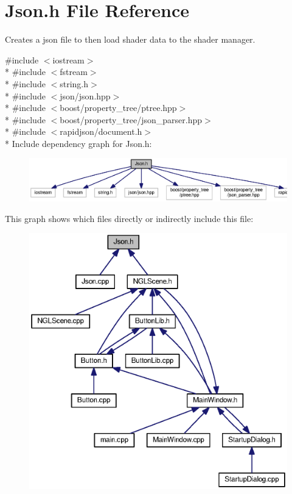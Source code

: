 \section{Json.\-h File Reference}
\label{_json_8h}


Creates a json file to then load shader data to the shader manager.  


{\ttfamily \#include $<$iostream$>$}\\*
{\ttfamily \#include $<$fstream$>$}\\*
{\ttfamily \#include $<$string.\-h$>$}\\*
{\ttfamily \#include $<$json/json.\-hpp$>$}\\*
{\ttfamily \#include $<$boost/property\-\_\-tree/ptree.\-hpp$>$}\\*
{\ttfamily \#include $<$boost/property\-\_\-tree/json\-\_\-parser.\-hpp$>$}\\*
{\ttfamily \#include $<$rapidjson/document.\-h$>$}\\*
Include dependency graph for Json.\-h\-:\nopagebreak
\begin{figure}[H]
\begin{center}
\leavevmode
\includegraphics[width=350pt]{_json_8h__incl}
\end{center}
\end{figure}
This graph shows which files directly or indirectly include this file\-:\nopagebreak
\begin{figure}[H]
\begin{center}
\leavevmode
\includegraphics[width=350pt]{_json_8h__dep__incl}
\end{center}
\end{figure}

